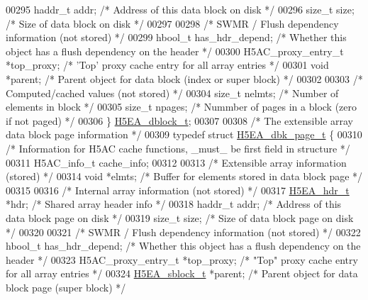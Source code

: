 \begin{DoxyCode}
00295     haddr\_t     addr;           \textcolor{comment}{/* Address of this data block on disk                   */}
00296     \textcolor{keywordtype}{size\_t}      size;           \textcolor{comment}{/* Size of data block on disk                           */}
00297 
00298     \textcolor{comment}{/* SWMR / Flush dependency information (not stored) */}
00299     hbool\_t     has\_hdr\_depend; \textcolor{comment}{/* Whether this object has a flush dependency on the header */}
00300     H5AC\_proxy\_entry\_t *top\_proxy;      \textcolor{comment}{/* 'Top' proxy cache entry for all array entries */}
00301     \textcolor{keywordtype}{void}        *parent;        \textcolor{comment}{/* Parent object for data block (index or super block)  */}
00302 
00303     \textcolor{comment}{/* Computed/cached values (not stored) */}
00304     \textcolor{keywordtype}{size\_t}      nelmts;         \textcolor{comment}{/* Number of elements in block                */}
00305     \textcolor{keywordtype}{size\_t}      npages;         \textcolor{comment}{/* Nummber of pages in a block (zero if not paged) */}
00306 \} \hyperlink{struct_h5_e_a__dblock__t}{H5EA\_dblock\_t};
00307 
00308 \textcolor{comment}{/* The extensible array data block page information */}
00309 \textcolor{keyword}{typedef} \textcolor{keyword}{struct }\hyperlink{struct_h5_e_a__dbk__page__t}{H5EA\_dbk\_page\_t} \{
00310     \textcolor{comment}{/* Information for H5AC cache functions, \_must\_ be first field in structure */}
00311     H5AC\_info\_t cache\_info;
00312 
00313     \textcolor{comment}{/* Extensible array information (stored) */}
00314     \textcolor{keywordtype}{void}        *elmts;         \textcolor{comment}{/* Buffer for elements stored in data block page */}
00315 
00316     \textcolor{comment}{/* Internal array information (not stored) */}
00317     \hyperlink{struct_h5_e_a__hdr__t}{H5EA\_hdr\_t}  *hdr;           \textcolor{comment}{/* Shared array header info                         */}
00318     haddr\_t     addr;           \textcolor{comment}{/* Address of this data block page on disk          */}
00319     \textcolor{keywordtype}{size\_t}      size;           \textcolor{comment}{/* Size of data block page on disk                  */}
00320 
00321     \textcolor{comment}{/* SWMR / Flush dependency information (not stored) */}
00322     hbool\_t     has\_hdr\_depend; \textcolor{comment}{/* Whether this object has a flush dependency on the header */}
00323     H5AC\_proxy\_entry\_t *top\_proxy;      \textcolor{comment}{/* "Top" proxy cache entry for all array entries */}
00324     \hyperlink{struct_h5_e_a__sblock__t}{H5EA\_sblock\_t} *parent;      \textcolor{comment}{/* Parent object for data block page (super block)  */}

\end{DoxyCode}
